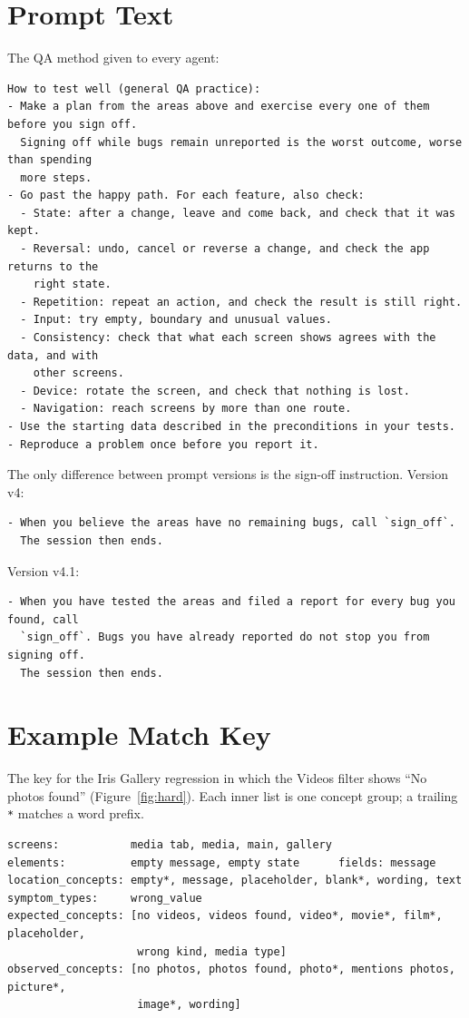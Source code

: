 \documentclass[sigconf]{acmart}
\begin{document}
\section{Prompt Text}
\label{app:prompt}
The QA method given to every agent:
\begin{lstlisting}
How to test well (general QA practice):
- Make a plan from the areas above and exercise every one of them before you sign off.
  Signing off while bugs remain unreported is the worst outcome, worse than spending
  more steps.
- Go past the happy path. For each feature, also check:
  - State: after a change, leave and come back, and check that it was kept.
  - Reversal: undo, cancel or reverse a change, and check the app returns to the
    right state.
  - Repetition: repeat an action, and check the result is still right.
  - Input: try empty, boundary and unusual values.
  - Consistency: check that what each screen shows agrees with the data, and with
    other screens.
  - Device: rotate the screen, and check that nothing is lost.
  - Navigation: reach screens by more than one route.
- Use the starting data described in the preconditions in your tests.
- Reproduce a problem once before you report it.
\end{lstlisting}
The only difference between prompt versions is the sign-off instruction. Version v4:
\begin{lstlisting}
- When you believe the areas have no remaining bugs, call `sign_off`.
  The session then ends.
\end{lstlisting}
Version v4.1:
\begin{lstlisting}
- When you have tested the areas and filed a report for every bug you found, call
  `sign_off`. Bugs you have already reported do not stop you from signing off.
  The session then ends.
\end{lstlisting}

\section{Example Match Key}
\label{app:key}
The key for the Iris Gallery regression in which the Videos filter shows ``No photos found''
(Figure~\ref{fig:hard}). Each inner list is one concept group; a trailing \texttt{*} matches a word
prefix.
\begin{lstlisting}
screens:           media tab, media, main, gallery
elements:          empty message, empty state      fields: message
location_concepts: empty*, message, placeholder, blank*, wording, text
symptom_types:     wrong_value
expected_concepts: [no videos, videos found, video*, movie*, film*, placeholder,
                    wrong kind, media type]
observed_concepts: [no photos, photos found, photo*, mentions photos, picture*,
                    image*, wording]
\end{lstlisting}
\end{document}
